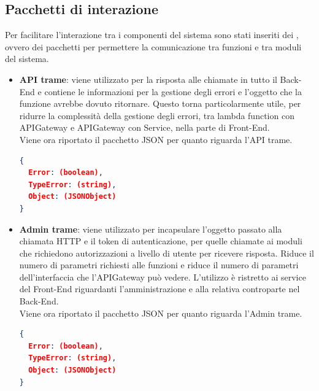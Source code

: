 \documentclass[../DefinizioneDiProdotto.tex]{subfiles}
\begin{document}
	\subsection{Pacchetti di interazione}
	Per facilitare l'interazione tra i componenti del sistema sono stati inseriti dei , ovvero dei pacchetti  per permettere la comunicazione tra funzioni e tra moduli del sistema.
	\begin{itemize}
		\item \textbf{API trame}: viene utilizzato per la risposta alle chiamate in tutto il Back-End e contiene le informazioni per la gestione degli errori e l'oggetto che la funzione avrebbe dovuto ritornare. Questo torna particolarmente utile, per ridurre la complessità della gestione degli errori, tra lambda function con APIGateway e APIGateway con Service, nella parte di Front-End.\\
		Viene ora riportato il pacchetto JSON per quanto riguarda l'API trame.
		\begin{lstlisting}[language=json,firstnumber=1]
{
  Error: (boolean),
  TypeError: (string),
  Object: (JSONObject)
}
		\end{lstlisting}

		\item \textbf{Admin trame}: viene utilizzato per incapsulare l'oggetto passato alla chiamata HTTP e il token di autenticazione, per quelle chiamate ai moduli che richiedono autorizzazioni a livello di utente per ricevere risposta. Riduce il numero di parametri richiesti alle funzioni e riduce il numero di parametri dell'interfaccia che l'APIGateway può vedere. L'utilizzo è ristretto ai service del Front-End riguardanti l'amministrazione e alla relativa controparte nel Back-End.\\
		Viene ora riportato il pacchetto JSON per quanto riguarda l'Admin trame.
		\begin{lstlisting}[language=json,firstnumber=1]
{
  Error: (boolean),
  TypeError: (string),
  Object: (JSONObject)
}
		\end{lstlisting}
	\end{itemize}
\end{document}
